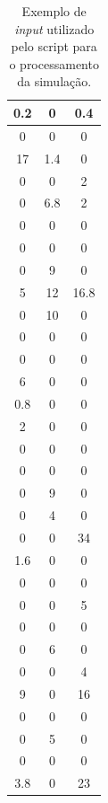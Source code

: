 \begin{table}[H]
\caption{Exemplo de \emph{input} utilizado pelo script para o processamento da simulação.}
\label{q.input}
\centering

\begin{tabular}{|c|c|c|}
\hline
0.2 & 0   & 0.4  \\ \hline
0   & 0   & 0    \\ \hline
17  & 1.4 & 0    \\ \hline
0   & 0   & 2    \\ \hline
0   & 6.8 & 2    \\ \hline
0   & 0   & 0    \\ \hline
0   & 0   & 0    \\ \hline
0   & 9   & 0    \\ \hline
5   & 12  & 16.8 \\ \hline
0   & 10  & 0    \\ \hline
0   & 0   & 0    \\ \hline
0   & 0   & 0    \\ \hline
6   & 0   & 0    \\ \hline
0.8 & 0   & 0    \\ \hline
2   & 0   & 0    \\ \hline
0   & 0   & 0    \\ \hline
0   & 0   & 0    \\ \hline
0   & 9   & 0    \\ \hline
0   & 4   & 0    \\ \hline
0   & 0   & 34   \\ \hline
1.6 & 0   & 0    \\ \hline
0   & 0   & 0    \\ \hline
0   & 0   & 5    \\ \hline
0   & 0   & 0    \\ \hline
0   & 6   & 0    \\ \hline
0   & 0   & 4    \\ \hline
9   & 0   & 16   \\ \hline
0   & 0   & 0    \\ \hline
0   & 5   & 0    \\ \hline
0   & 0   & 0    \\ \hline
3.8 & 0   & 23   \\ \hline
\end{tabular}
\vspace*{15px}
\end{table}


